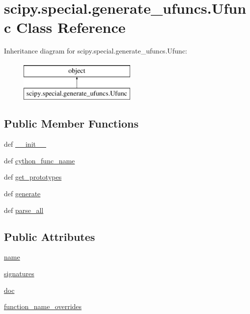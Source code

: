 \hypertarget{classscipy_1_1special_1_1generate__ufuncs_1_1Ufunc}{}\section{scipy.\+special.\+generate\+\_\+ufuncs.\+Ufunc Class Reference}
\label{classscipy_1_1special_1_1generate__ufuncs_1_1Ufunc}
Inheritance diagram for scipy.\+special.\+generate\+\_\+ufuncs.\+Ufunc\+:\begin{figure}[H]
\begin{center}
\leavevmode
\includegraphics[height=2.000000cm]{classscipy_1_1special_1_1generate__ufuncs_1_1Ufunc}
\end{center}
\end{figure}
\subsection*{Public Member Functions}
\begin{DoxyCompactItemize}
\item 
def \hyperlink{classscipy_1_1special_1_1generate__ufuncs_1_1Ufunc_a47c81ba3c9e7a6c71f41b9d2577fc910}{\+\_\+\+\_\+init\+\_\+\+\_\+}
\item 
def \hyperlink{classscipy_1_1special_1_1generate__ufuncs_1_1Ufunc_ad187ec79d03ded68c6c9053311ecd456}{cython\+\_\+func\+\_\+name}
\item 
def \hyperlink{classscipy_1_1special_1_1generate__ufuncs_1_1Ufunc_a6e7cf726ca2c17471aa6df056cd5f0df}{get\+\_\+prototypes}
\item 
def \hyperlink{classscipy_1_1special_1_1generate__ufuncs_1_1Ufunc_a885e26b79e40cbccf29d9155399eafdf}{generate}
\item 
def \hyperlink{classscipy_1_1special_1_1generate__ufuncs_1_1Ufunc_a0a4137310db2e53ef9738debcddaef98}{parse\+\_\+all}
\end{DoxyCompactItemize}
\subsection*{Public Attributes}
\begin{DoxyCompactItemize}
\item 
\hyperlink{classscipy_1_1special_1_1generate__ufuncs_1_1Ufunc_a8a4840ae88cde0bda4843edaf9b635ff}{name}
\item 
\hyperlink{classscipy_1_1special_1_1generate__ufuncs_1_1Ufunc_a63d442dedbd8db084909732df2350bae}{signatures}
\item 
\hyperlink{classscipy_1_1special_1_1generate__ufuncs_1_1Ufunc_a9d85ddcb3acc74e044e887e059462227}{doc}
\item 
\hyperlink{classscipy_1_1special_1_1generate__ufuncs_1_1Ufunc_acefdd895c588c0c28a48e56957e07e55}{function\+\_\+name\+\_\+overrides}
\end{DoxyCompactItemize}


